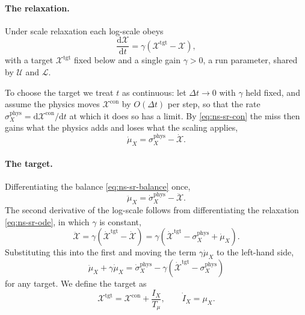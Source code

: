 \documentclass{article}
\begin{document}
\paragraph{The relaxation.}
Under scale relaxation each log-scale obeys
\begin{equation}\label{eq:ns-sr-ode}
  \frac{\mathrm{d} \mathcal{X}}{\mathrm{d} t} = \gamma \left( \mathcal{X}^{\mathrm{tgt}} - \mathcal{X} \right),
\end{equation}
with a target $\mathcal{X}^{\mathrm{tgt}}$ fixed below and a single gain
$\gamma > 0$, a run parameter, shared by $\mathcal{U}$ and $\mathcal{L}$.\par
To choose the target we treat $t$ as continuous: let $\Delta t \to 0$ with
$\gamma$ held fixed, and assume the physics moves
$\mathcal{X}^{\mathrm{con}}$ by $O(\Delta t)$ per step, so that the rate
$\sigma_X^{\mathrm{phys}} = \mathrm{d} \mathcal{X}^{\mathrm{con}} / \mathrm{d} t$
at which it does so has a limit. By \eqref{eq:ns-sr-con} the miss then
gains what the physics adds and loses what the scaling applies,
\begin{equation}\label{eq:ns-sr-balance}
  \dot \mu_X = \sigma_X^{\mathrm{phys}} - \dot{\mathcal{X}} .
\end{equation}

\paragraph{The target.}
Differentiating the balance \eqref{eq:ns-sr-balance} once,
\begin{equation*}
  \ddot \mu_X = \dot \sigma_X^{\mathrm{phys}} - \ddot{\mathcal{X}} .
\end{equation*}
The second derivative of the log-scale follows from differentiating the
relaxation \eqref{eq:ns-sr-ode}, in which $\gamma$ is constant,
\begin{equation*}
  \ddot{\mathcal{X}}
  = \gamma \left( \dot{\mathcal{X}}^{\mathrm{tgt}} - \dot{\mathcal{X}} \right)
  = \gamma \left( \dot{\mathcal{X}}^{\mathrm{tgt}} - \sigma_X^{\mathrm{phys}} + \dot \mu_X \right).
\end{equation*}
 Substituting this into the first and moving the term
$\gamma \dot \mu_X$ to the left-hand side,
\begin{equation}\label{eq:ns-sr-general}
  \ddot \mu_X + \gamma \dot \mu_X
  = \dot \sigma_X^{\mathrm{phys}}
  - \gamma \left( \dot{\mathcal{X}}^{\mathrm{tgt}} - \sigma_X^{\mathrm{phys}} \right)
\end{equation}
for any target. We define the target as
\begin{equation}\label{eq:ns-sr-target}
  \mathcal{X}^{\mathrm{tgt}} = \mathcal{X}^{\mathrm{con}} + \frac{I_X}{T_\mu},
  \qquad
  \dot I_X = \mu_X .
\end{equation}
\end{document}
